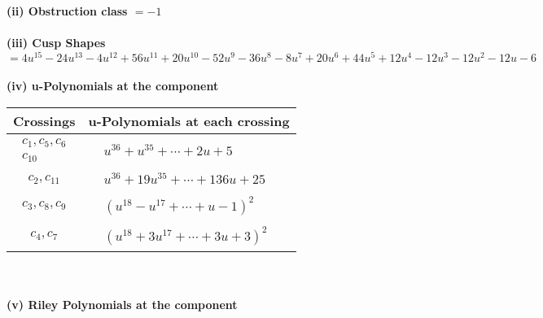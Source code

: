 \documentclass[1p]{elsarticle_modified}
\theoremstyle{definition}
\begin{document}
\flushleft \textbf{(ii) Obstruction class $= -1$}\\~\\
\flushleft \textbf{(iii) Cusp Shapes $= 4 u^{15}-24 u^{13}-4 u^{12}+56 u^{11}+20 u^{10}-52 u^9-36 u^8-8 u^7+20 u^6+44 u^5+12 u^4-12 u^3-12 u^2-12 u-6$}\\~\\
\newpage\renewcommand{\arraystretch}{1}
\flushleft \textbf{(iv) u-Polynomials at the component}\newline \\
\begin{tabular}{m{50pt}|m{274pt}}
Crossings & \hspace{64pt}u-Polynomials at each crossing \\
\hline $$\begin{aligned}c_{1},c_{5},c_{6}\\c_{10}\end{aligned}$$&$\begin{aligned}
&u^{36}+u^{35}+\cdots+2 u+5
\end{aligned}$\\
\hline $$\begin{aligned}c_{2},c_{11}\end{aligned}$$&$\begin{aligned}
&u^{36}+19 u^{35}+\cdots+136 u+25
\end{aligned}$\\
\hline $$\begin{aligned}c_{3},c_{8},c_{9}\end{aligned}$$&$\begin{aligned}
&(u^{18}- u^{17}+\cdots+u-1)^{2}
\end{aligned}$\\
\hline $$\begin{aligned}c_{4},c_{7}\end{aligned}$$&$\begin{aligned}
&(u^{18}+3 u^{17}+\cdots+3 u+3)^{2}
\end{aligned}$\\
\hline
\end{tabular}\\~\\
\newpage\renewcommand{\arraystretch}{1}
\flushleft \textbf{(v) Riley Polynomials at the component}\newline \\
\end{document}
